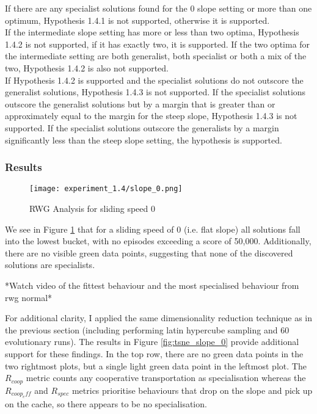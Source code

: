 \documentclass[12pt]{article}
\begin{document}
If there are any specialist solutions found for the 0 slope setting or more than one optimum, Hypothesis 1.4.1 is not supported, otherwise it is supported.\\

If the intermediate slope setting has more or less than two optima, Hypothesis 1.4.2 is not supported, if it has exactly two, it is supported.
If the two optima for the intermediate setting are both generalist, both specialist or both a mix of the two, Hypothesis 1.4.2 is also not supported.\\

If Hypothesis 1.4.2 is supported and the specialist solutions do not outscore the generalist solutions, Hypothesis 1.4.3 is not supported.
If the specialist solutions outscore the generalist solutions but by a margin that is greater than or approximately equal to the margin for the steep slope, Hypothesis 1.4.3 is not supported.
If the specialist solutions outscore the generalists by a margin significantly less than the steep slope setting, the hypothesis is supported.\\

\subsubsection{Results}

\begin{figure}[h]
\centering
\texttt{[image: experiment\_1.4/slope\_0.png]}
\caption{RWG Analysis for sliding speed 0}
\label{fig:slope_0_rwg}
\end{figure}

We see in Figure \ref{fig:slope_0_rwg} that for a sliding speed of 0 (i.e. flat slope) all solutions fall into the lowest bucket, with no episodes exceeding a score of 50,000.
Additionally, there are no visible green data points, suggesting that none of the discovered solutions are specialists.

*Watch video of the fittest behaviour and the most specialised behaviour from rwg normal*

For additional clarity, I applied the same dimensionality reduction technique as in the previous section (including performing latin hypercube sampling and 60 evolutionary runs).
The results in Figure \ref{fig:tsne_slope_0} provide additional support for these findings.
In the top row, there are no green data points in the two rightmost plots, but a single light green data point in the leftmost plot.
The $R_{coop}$ metric counts any cooperative transportation as specialisation whereas the $R_{coop_eff}$ and $R_{spec}$ metrics prioritise behaviours that drop on the slope and pick up on the cache, so there appears to be no specialisation.\\
\end{document}
